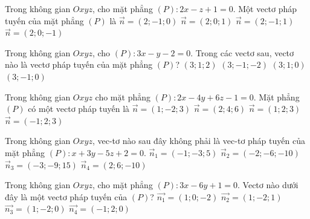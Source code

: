 \begin{ex}%
	Trong không gian $Oxyz$, cho mặt phẳng $(P)\colon 2x-z+1=0$. Một vectơ pháp tuyến của mặt phẳng $ (P) $ là
	\choice
	{$ \overrightarrow{n}=(2;-1;0) $}
	{$ \overrightarrow{n}=(2;0;1) $}
	{$ \overrightarrow{n}=(2;-1;1) $}
	{\True $ \overrightarrow{n}=(2;0;-1) $}
\end{ex}
\begin{ex}%
	Trong không gian $Oxyz$,  cho  $(P)\colon 3x-y-2=0$. Trong các vectơ sau, vectơ nào là vectơ pháp tuyến của mặt phẳng $(P)$?
	\choice
	{$(3;1;2)$}
	{$(3;-1;-2)$}
	{$(3;1;0)$}
	{\True $(3;-1;0)$}
\end{ex}
\begin{ex}%
	Trong không gian $Oxyz$ cho mặt phẳng $(P)\colon 2x-4y+6z-1=0$. Mặt phẳng $(P)$ có một vectơ pháp tuyến là
	\choice
	{\True $\vec{n}=(1;-2;3)$}
	{$\vec{n}=(2;4;6)$}
	{$\vec{n}=(1;2;3)$}
	{$\vec{n}=(-1;2;3)$}
\end{ex}
\begin{ex}%
	Trong không gian $Oxyz$, vec-tơ nào sau đây không phải là vec-tơ pháp tuyến của mặt phẳng $(P):x+3y-5z+2=0$.
	\choice
	{$\overrightarrow{n}_1=(-1;-3;5)$}
	{\True $\overrightarrow{n}_2=(-2;-6;-10)$}
	{$\overrightarrow{n}_3=(-3;-9;15)$}
	{$\overrightarrow{n}_4=(2;6;-10)$}
\end{ex}
\begin{ex}%
	Trong không gian $Oxyz$, cho mặt phẳng $(P)\colon 3x-6y+1=0$. Vectơ nào dưới đây là một vectơ pháp tuyến của $(P)$?
	\choice
	{ $\vec{n_1}=(1;0;-2)$}
	{$\vec{n_2}=(1;-2;1)$}
	{\True $\vec{n_3}=(1;-2;0)$}
	{$\vec{n_4}=(-1;2;0)$}
\end{ex}

